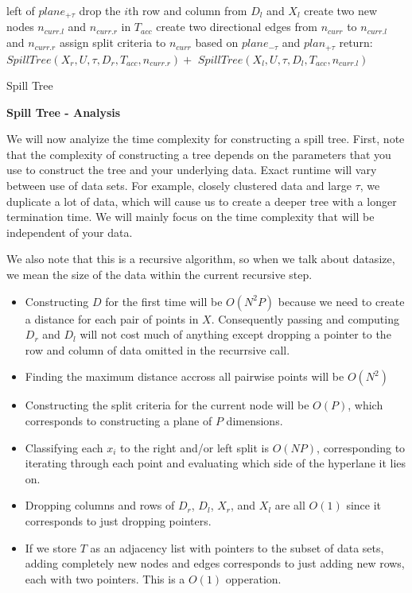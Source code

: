 \begin{algorithm}
{{{{                   \hspace{10pt} left of $plane_{+\tau}$ \;
                drop the $i$th row and column from $D_{l}$ and $X_{l}$ \;
            }
        }
        create two new nodes $n_{curr.l}$ and $n_{curr.r}$ in $T_{acc}$ \;
        create two directional edges from $n_{curr}$ to $n_{curr.l}$ and $n_{curr.r}$ \;
        assign split criteria to $n_{curr}$ based on $plane_{-\tau}$ and $plan_{+\tau}$
        return: $SpillTree(X_{r}, U, \tau, D_{r}, T_{acc}, n_{curr.r}) + $\; 
        \hspace{10pt} $SpillTree(X_{l}, U, \tau, D_{l}, T_{acc}, n_{curr.l})$
    }
}
\caption{Spill Tree\label{ST1}}
\end{algorithm}

\vspace{5 mm}
\noindent
\textbf{Spill Tree - Analysis}

\vspace{5 mm}
\noindent
We will now analyize the time complexity for constructing a spill tree. First, 
note that the complexity of constructing a tree depends on the parameters that 
you use to construct the tree and your underlying data. Exact runtime will 
vary between use of data sets. For example, closely clustered data and large 
$\tau$, we duplicate a lot of data, which will cause us to create a deeper tree 
with a longer termination time. We will mainly focus on the time complexity 
that will be independent of your data.

\vspace{5 mm}
\noindent
We also note that this is a recursive algorithm, so when we talk about 
datasize, we mean the size of the data within the current recursive step.

\begin{itemize}
\item Constructing $D$ for the first time will be $O(N^{2} P)$ because we need 
to create a distance for each pair of points in $X$. Consequently passing and 
computing $D_{r}$ and $D_{l}$ will not cost much of anything except dropping a 
pointer to the row and column of data omitted in the recurrsive call.
\item Finding the maximum distance accross all pairwise points will be 
$O(N^{2})$
\item Constructing the split criteria for the current node will be $O(P)$, 
which corresponds to constructing a plane of $P$ dimensions.
\item Classifying each $x_{i}$ to the right and/or left split is $O(N P)$, 
corresponding to iterating through each point and evaluating which side of the 
hyperlane it lies on.
\item Dropping columns and rows of $D_{r}$, $D_{l}$, $X_{r}$, and $X_{l}$ are 
all $O(1)$ since it corresponds to just dropping pointers.
\item If we store $T$ as an adjacency list with pointers to the subset of data 
sets, adding completely new nodes and edges corresponds to just adding new rows, 
each with two pointers. This is a $O(1)$ opperation.
\end{itemize}

